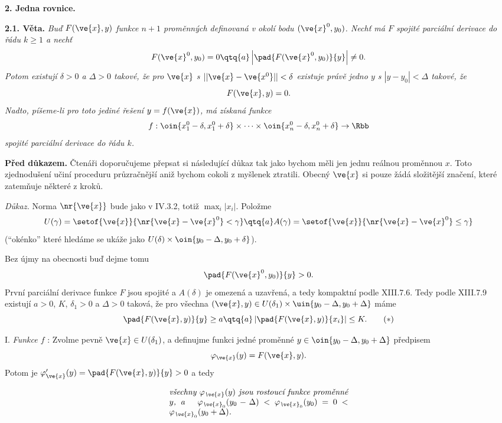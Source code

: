 \documentclass[12pt]{article}
\begin{document}
{ 
 \vskip10mm
 
  
 {\large\bf 2. Jedna rovnice.}
 
 \bigskip
 
{\bf 2.1.
Věta.} {\em Buď $F(\ve{x},y)$ funkce  $n+1$ proměnných definovaná v okolí
 bodu $(\ve{x}^0,y_0)$. Nechť má $F$ spojité parciální derivace do řádu  
$k\geq 1$ a nechť
 $$
 F(\ve{x}^0,y_0)=0\qtq{a} \left|\pad{F(\ve{x}^0,y_0)}{y}\right|\neq 0.
 $$
 Potom existují $\delta>0$ a $\Delta>0$ takové, že pro $\ve{x}$ s
$||\ve{x}-\ve{x^0}||<\delta$ existuje právě jedno
$y$  s $|y-y_0|<\Delta$ takové, že
$$F(\ve{x},y)=0.$$ 
Nadto, píšeme-li pro toto jediné řešení $y=f(\ve{x})$,  má získaná funkce
$$
f:\oin{x^0_1-\delta,x^0_1+\delta}\times\cdots\times\oin{x^0_n-\delta,x^0_n+\delta}\to\Rbb
$$
spojité parciální derivace do řádu $k$.}

\smallskip

{\bf Před důkazem.} Čtenáři doporučujeme přepsat si následující důkaz tak jako bychom měli jen jednu reálnou proměnnou  $x$. Toto zjednodušení učiní proceduru průzračnější aniž bychom cokoli z myšlenek ztratili. Obecný $\ve{x}$ si pouze žádá složitější značení, které zatemňuje některé z kroků.
 
 {\em Důkaz.} Norma $\nr{\ve{x}}$ bude jako v IV.3.2, totiž $\max_i|x_i|$. Položme
 $$
 U(\gamma)=\setof{\ve{x}}{\nr{\ve{x}-\ve{x}^0}<\gamma}\qtq{a}
 A(\gamma)=\setof{\ve{x}}{\nr{\ve{x}-\ve{x}^0}\leq\gamma}
 $$
(``okénko'' které hledáme se ukáže jako
 $U(\delta)\times\oin{y_0-\Delta,y_0+\delta}$).
 
 Bez újmy na obecnosti buď dejme tomu 
$$\pad{F(\ve{x}^0,y_0)}{y}>0.$$ 
První parciální derivace funkce $F$
jsou spojité a $A(\delta)$ je omezená a uzavřená, a tedy kompaktní podle XIII.7.6. Tedy podle XIII.7.9 existují $a>0$, $K$,
 $\delta_1>0$ a $\Delta>0$ taková, že pro všechna
$(\ve{x},y)\in U(\delta_1)\times\uin{y_0-\Delta,y_0+\Delta}$
máme
 \begin{equation}
 \pad{F(\ve{x},y)}{y}\geq a\qtq{a} \left|\pad{F(\ve{x},y)}{x_i}\right |\leq K.  \tag{$*$}
 \end{equation}
 
 
 \smallskip
 
 I. {\em Funkce $f$} : Zvolme pevně $\ve{x}\in U(\delta_1)$,
a definujme funkci jedné proměnné $y\in\oin{y_0-\Delta,y_0+\Delta}$
předpisem
 $$
 \varphi_{\ve{x}}(y)=F(\ve{x},y).
  $$
Potom je $\varphi_{\ve{x}}'(y)=\pad{F(\ve{x},y)}{y}>0$ a tedy

\vskip1mm

$$\parbox{3in}{\em všechny $\varphi_{\ve{x}}(y)$ jsou rostoucí funkce
proměnné $y$, a \quad $\varphi_{\ve{x}_0}(y_0-\Delta)<\varphi_{\ve{x}_0}(y_0)=0
<\varphi_{\ve{x}_0}(y_0+\Delta)$.}$$

}
\end{document}

